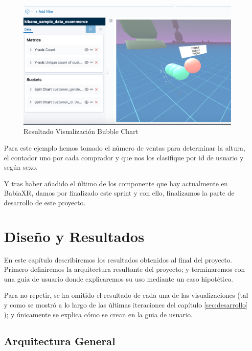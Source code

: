 \documentclass[a4paper, 12pt]{book}
\begin{document}
\begin{figure}[H]
  \centering
  \includegraphics[width=12cm, keepaspectratio]{img/development/bubbles-chart.png}
  \caption{Resultado Visualización Bubble Chart}
  \label{fig:bubblechart}
\end{figure}

Para este ejemplo hemos tomado el número de ventas para determinar la altura, el contador uno por cada comprador y que nos los clasifique por id de usuario y según sexo.

Y tras haber añadido el último de los componente que hay actualmente en BabiaXR, damos por finalizado este sprint y con ello, finalizamos la parte de desarrollo de este proyecto.




\cleardoublepage
\chapter{Diseño y Resultados}
\label{sec:resultados} 

En este capítulo describiremos los resultados obtenidos al final del proyecto. Primero definiremos la arquitectura resultante del proyecto; y terminaremos con una guia de usuario donde explicaremos su uso mediante un caso hipotético. 

Para no repetir, se ha omitido el resultado de cada una de las visualizaciones (tal y como se mostró a lo largo de las últimas iteraciones del capítulo \ref{sec:desarrollo} ); y únicamente se explica cómo se crean en la guia de usuario. 

\section{Arquitectura General}
\label{sec:arquitectura}
\end{document}
